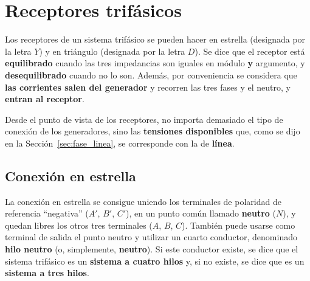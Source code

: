 	
	\section{Receptores trifásicos}\label{sec:conexiones}
	Los receptores de un sistema trifásico se pueden hacer en estrella (designada por la letra $Y$) y en triángulo (designada por la letra $D$). Se dice que el receptor está \textbf{equilibrado} cuando las tres impedancias son iguales en módulo \textbf{y} argumento, y \textbf{desequilibrado} cuando no lo son. Además, por conveniencia se considera que \textbf{las corrientes salen del generador} y recorren las tres fases y el neutro, y \textbf{entran al receptor}.
	
	\begin{remark}
	    Desde el punto de vista de los receptores, no importa demasiado el tipo de conexión de los generadores, sino las \textbf{tensiones disponibles} que, como se dijo en la Sección~\ref{sec:fase_linea}, se corresponde con la de \textbf{línea}.
	\end{remark}
	
	
	\subsection{Conexión en estrella}
	La conexión en estrella se consigue uniendo los terminales de polaridad de referencia ``negativa'' ($A'$, $B'$, $C'$), en un punto común llamado \textbf{neutro} ($N$), y quedan libres los otros tres terminales ($A$, $B$, $C$). También puede usarse como terminal de salida el punto neutro y utilizar un cuarto conductor, denominado \textbf{hilo neutro} (o, simplemente, \textbf{neutro}). Si este conductor existe, se dice que el sistema trifásico es un \textbf{sistema a cuatro hilos} y, si no existe, se dice que es un \textbf{sistema a tres hilos}. 
	
